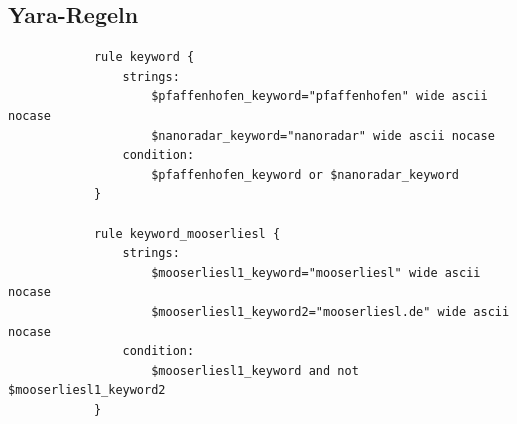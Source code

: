 
\begin{appendices}
		

%		

\renewcommand{\thesection}{\Alph{section}}

\begin{landscape}%
	\section{Yara-Regeln}
	\label{appendix:yara-regeln}
	\vspace*{-0.5cm}

\begin{multicols}{2}
		\begin{verbatim}
			rule keyword {
				strings:
					$pfaffenhofen_keyword="pfaffenhofen" wide ascii nocase
					$nanoradar_keyword="nanoradar" wide ascii nocase	
				condition:
					$pfaffenhofen_keyword or $nanoradar_keyword 
			}
			
			rule keyword_mooserliesl {
				strings:
					$mooserliesl1_keyword="mooserliesl" wide ascii nocase
					$mooserliesl1_keyword2="mooserliesl.de" wide ascii nocase	
				condition:
					$mooserliesl1_keyword and not $mooserliesl1_keyword2
			}
			

\end{verbatim}
\end{multicols}
\end{landscape}
\end{appendices}
